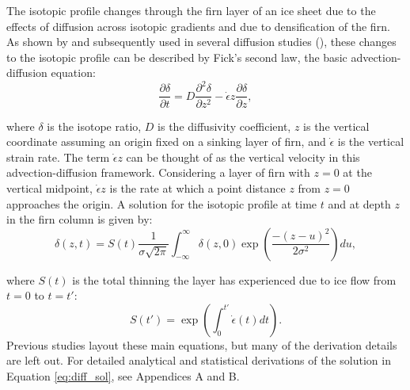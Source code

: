 \documentclass[draft, jgrga]{AGUTeX}
\begin{document}
\begin{article}
The isotopic profile changes through the firn layer of an ice sheet due to the effects of diffusion across isotopic gradients and due to densification of the firn. As shown by \citet{Johnsen1977} and subsequently used in several diffusion studies (\citep{Johnsen2000, Simonsen2011, Gkinis2014, vanderWel2015, Jones2017a, Holme2017}), these changes to the isotopic profile can be described by Fick's second law, the basic advection-diffusion equation:
\begin{equation}
\frac{\partial \delta}{\partial t}
= D \frac{\partial ^2 \delta}{\partial z^2}
- \dot{\epsilon}
z \frac{\partial \delta}{\partial z},
\end{equation}

\noindent where \begin{math} \delta \end{math} is the isotope ratio, \begin{math} D \end{math} is the diffusivity coefficient, \begin{math} z \end{math} is the vertical coordinate assuming an origin fixed on a sinking layer of firn, and \begin{math} \dot{\epsilon} \end{math} is the vertical strain rate. The term \begin{math} \dot{\epsilon} z \end{math} can be thought of as the vertical velocity in this advection-diffusion framework. Considering a layer of firn with \begin{math} z = 0 \end{math} at the vertical midpoint, \begin{math} \dot{\epsilon} z \end{math} is the rate at which a point distance \begin{math} z \end{math} from \begin{math} z=0 \end{math} approaches the origin. A solution for the isotopic profile at time $t$ and at depth $z$ in the firn column is given by:
\begin{equation}
\label{eq:diff_sol}
\delta (z,t) = S(t) \frac{1}{\sigma \sqrt{2 \pi}}
\int^\infty_{-\infty} \delta (z,0) \exp \left(\frac{-(z-u)^2}{2 \sigma ^2} \right)du,
\end{equation}

\noindent where \begin{math} S(t) \end{math} is the total thinning the layer has experienced due to ice flow from $t=0$ to $t=t'$:
\begin{equation}
S(t') = \exp \left( \int^{t'}_{0} \dot{\epsilon}(t) dt \right).
\end{equation}
Previous studies layout these main equations, but many of the derivation details are left out. For detailed analytical and statistical derivations of the solution in Equation \ref{eq:diff_sol}, see Appendices A and B.


\end{article}
\end{document}
